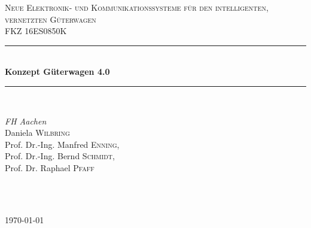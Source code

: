 \begin{titlepage}
    \newcommand{\HRule}{\rule{\linewidth}{0.5mm}} %
    \center %
    \vspace*{2cm}
    \textsc{\LARGE Neue Elektronik- und Kommunikationssysteme für den intelligenten, vernetzten Güterwagen}\\[1.5cm] %
    \textsc{\large FKZ 16ES0850K}\\[0.5cm] %
    \HRule \\[0.4cm]
    { \huge \bfseries Konzept Güterwagen 4.0}\\[0.4cm] %
    \HRule \\[1.5cm]
    \begin{minipage}{0.4\textwidth}
    \begin{flushleft} \large
    \emph{FH Aachen}\\
    Daniela \textsc{Wilbring}\\
    Prof. Dr.-Ing. Manfred \textsc{Enning},\\
    Prof. Dr.-Ing. Bernd \textsc{Schmidt},\\
    Prof. Dr. Raphael \textsc{Pfaff}\\
    \end{flushleft}
    \end{minipage}
    ~
    \begin{minipage}{0.4\textwidth}
    \begin{flushright} \large
    \end{flushright}
    \end{minipage}\\[2cm]
    {\large \today}\\[2cm] %
    \vfill %
\end{titlepage}

